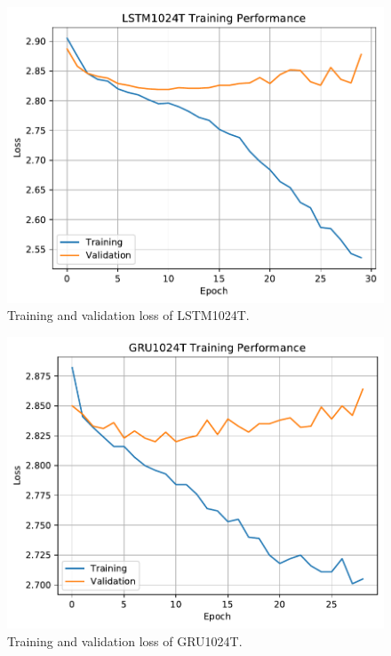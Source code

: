 \documentclass[a4paper,12pt]{article}
\begin{document}
\begin{minipage}{\linewidth}
	\centering
	\begin{minipage}{0.48\linewidth}
		\begin{figure}[H]
			\includegraphics[width=\linewidth]{figures/LSTM1024T_Training_Performance.pdf}
			\caption{Training and validation loss of LSTM1024T.}
			\label{fig:lstm_train_performance}
		\end{figure}
	\end{minipage}
	\hfill
	\begin{minipage}{0.48\linewidth}
		\begin{figure}[H]
			\includegraphics[width=\linewidth]{figures/GRU1024T_Training_Performance.pdf}
			\caption{Training and validation loss of GRU1024T.}
			\label{fig:gru_train_performance}
		\end{figure}
	\end{minipage}
\end{minipage}
\end{document}
